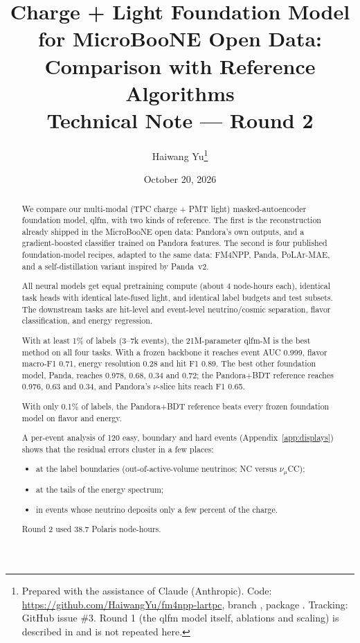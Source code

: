 \documentclass[11pt,a4paper]{article}
\title{\textbf{Charge + Light Foundation Model for MicroBooNE Open Data:\\ Comparison with Reference Algorithms}\\[4pt]
\large Technical Note --- Round 2}
\author{Haiwang Yu\thanks{Prepared with the assistance of Claude (Anthropic). Code: \url{https://github.com/HaiwangYu/fm4npp-lartpc}, branch \code{round2-references}, package \code{multi-modal-qlmatch/qlfm}. Tracking: GitHub issue \#3. Round 1 (the qlfm model itself, ablations and scaling) is described in \code{docs/technote-round1.pdf} and is not repeated here.}}
\date{October 20, 2026}
\newcommand{\numu}{\ensuremath{\nu_\mu}}
\begin{document}
\maketitle

\begin{abstract}
\noindent
We compare our multi-modal (TPC charge + PMT light) masked-autoencoder foundation model, qlfm, with two kinds of reference. The first is the reconstruction already shipped in the MicroBooNE open data: Pandora's own outputs, and a gradient-boosted classifier trained on Pandora features. The second is four published foundation-model recipes, adapted to the same data: FM4NPP, Panda, PoLAr-MAE, and a self-distillation variant inspired by Panda~v2.

All neural models get equal pretraining compute (about 4 node-hours each), identical task heads with identical late-fused light, and identical label budgets and test subsets. The downstream tasks are hit-level and event-level neutrino/cosmic separation, flavor classification, and energy regression.

With at least 1\% of labels (3--7k events), the 21M-parameter qlfm-M is the best method on all four tasks. With a frozen backbone it reaches event AUC 0.999, flavor macro-F1 0.71, energy resolution 0.28 and hit F1 0.89. The best other foundation model, Panda, reaches 0.978, 0.68, 0.34 and 0.72; the Pandora+BDT reference reaches 0.976, 0.63 and 0.34, and Pandora's $\nu$-slice hits reach F1 0.65.

With only 0.1\% of labels, the Pandora+BDT reference beats every frozen foundation model on flavor and energy.

A per-event analysis of 120 easy, boundary and hard events (Appendix~\ref{app:displays}) shows that the residual errors cluster in a few places:
\begin{itemize}
  \item at the label boundaries (out-of-active-volume neutrinos; NC versus \numu CC);
  \item at the tails of the energy spectrum;
  \item in events whose neutrino deposits only a few percent of the charge.
\end{itemize}
Round 2 used 38.7 Polaris node-hours.
\end{abstract}

\tableofcontents
\clearpage

\end{document}
